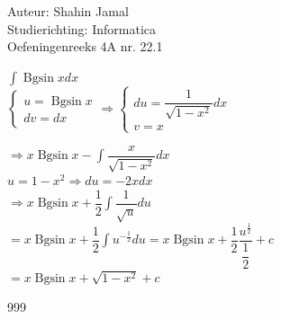 \documentclass[a4paper]{article}
\newcommand{\Bgsin}{\operatorname{Bgsin}}
\begin{document}
 
\noindent \large Auteur: Shahin Jamal \\
\noindent \large Studierichting: Informatica\\
\noindent \large Oefeningenreeks 4A nr. 22.1\\

\medskip

\normalsize

$\displaystyle\int \Bgsin x dx$\\

$\left\{
   \begin{array}{l}
       u = \Bgsin x\\
       dv = dx
   \end{array}
\right.
\Rightarrow
\left\{
   \begin{array}{l}
       du = \dfrac{1}{\sqrt{1-x^2}} dx \\
       v = x
   \end{array}
\right.$

$\Rightarrow x\Bgsin x - \displaystyle\int \dfrac{x}{\sqrt{1-x^2}}dx$\\

$u = 1-x^2 \Rightarrow du = -2x dx$\\

$\Rightarrow x\Bgsin x + \dfrac{1}{2}\displaystyle\int \dfrac{1}{\sqrt{u}}du$\\

$= x\Bgsin x + \dfrac{1}{2}\displaystyle\int u^{-\tfrac{1}{2}}du = x\Bgsin x + \dfrac{1}{2} \dfrac{u^{\tfrac{1}{2}}}{\dfrac{1}{2}} + c$\\

$= x\Bgsin x + \sqrt{1-x^2} + c$\\

\begin{thebibliography}{999}
\end{thebibliography}
\end{document}
